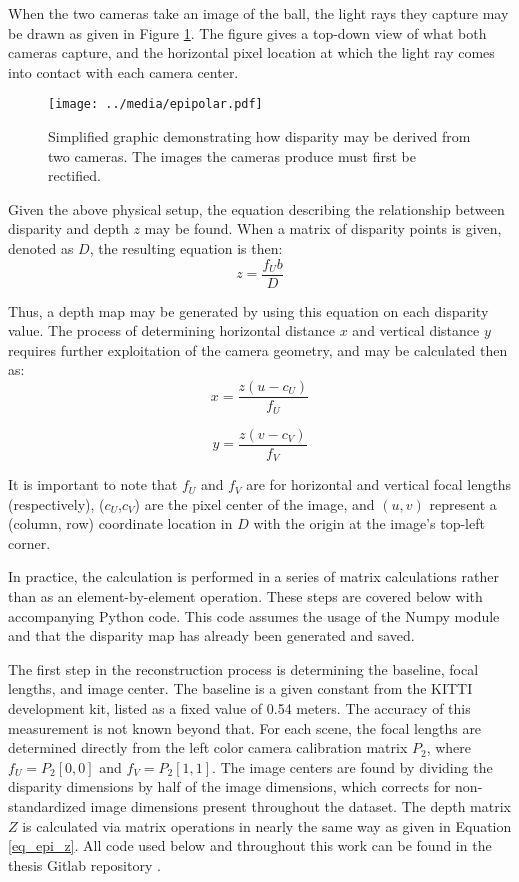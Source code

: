 When the two cameras take an image of the ball, the light rays they capture may be drawn as given in Figure \ref{epipolar}. The figure gives a top-down view of what both cameras capture, and the horizontal pixel location at which the light ray comes into contact with each camera center. 

\begin{figure}[ht]
    \centering
	\texttt{[image: ../media/epipolar.pdf]}
	\caption{Simplified graphic demonstrating how disparity may be derived from two cameras. The images the cameras produce must first be rectified.}
	\label{epipolar}
\end{figure}

Given the above physical setup, the equation describing the relationship between disparity and depth $z$ may be found. When a matrix of disparity points is given, denoted as $D$, the resulting equation is then: 
\begin{equation}
z = \frac{f_U b}{D}
\label{eq_epi_z}
\end{equation}

Thus, a depth map may be generated by using this equation on each disparity value. The process of determining horizontal distance $x$ and vertical distance $y$ requires further exploitation of the camera geometry, and may be calculated then as: 
\begin{equation}
x = \frac{z (u - c_U)}{f_U}
\end{equation}

\begin{equation}
y = \frac{z(v - c_V)}{f_V}
\end{equation}

It is important to note that $f_U$ and $f_V$ are for horizontal and vertical focal lengths (respectively), ($c_U$,$c_V$) are the pixel center of the image, and $(u,v)$ represent a (column, row) coordinate location in $D$ with the origin at the image's top-left corner.

In practice, the calculation is performed in a series of matrix calculations rather than as an element-by-element operation. These steps are covered below with accompanying Python code. This code assumes the usage of the Numpy module and that the disparity map has already been generated and saved.

The first step in the reconstruction process is determining the baseline, focal lengths, and image center. The baseline is a given constant from the KITTI development kit, listed as a fixed value of 0.54 meters. The accuracy of this measurement is not known beyond that. For each scene, the focal lengths are determined directly from the left color camera calibration matrix $P_2$, where $f_U=P_2[0,0]$ and $f_V=P_2[1,1]$. The image centers are found by dividing the disparity dimensions by half of the image dimensions, which corrects for non-standardized image dimensions present throughout the dataset. The depth matrix $Z$ is calculated via matrix operations in nearly the same way as given in Equation \ref{eq_epi_z}. All code used below and throughout this work can be found in the thesis Gitlab repository \cite{gonzalez_smart3d_2019}. 

